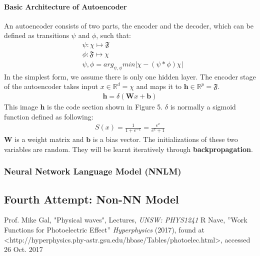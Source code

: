 \documentclass[paper=a4, fontsize=12pt]{scrartcl}
\begin{document}
\paragraph{Basic Architecture of Autoencoder}
An autoencoder consists of two parts, the encoder and the decoder, which can be defined as transitions $\psi$ and $\phi$, such that:
\begin{align*}
& \psi : \chi \mapsto \mathfrak{F} \\
& \phi : \mathfrak{F} \mapsto \chi \\
& \psi, \phi = arg_{\psi, \phi} min \lvert \chi - (\psi * \phi) \chi \rvert
\end{align*}
In the simplest form, we assume there is only one hidden layer. The encoder stage of the autoencoder takes input $x \in \mathbb{R}^{d} = \chi$ and maps it to $\mathbf{h} \in \mathbb{R}^{p} = \mathfrak{F}$. \\
\begin{align*}
\mathbf{h} = \delta (\mathbf{W}x + \mathbf{b})
\end{align*}
This image $\mathbf{h}$ is the code section shown in Figure 5. $\delta$ is normally a sigmoid function defined as following: \\
\begin{align*}
S(x) = \frac{1}{1 + e^{-x}} = \frac{e^x}{e^x + 1}
\end{align*}
$\mathbf{W}$ is a weight matrix and $\mathbf{b}$ is a bias vector. The initializations of these two variables are random. They will be learnt iteratively through \textbf{backpropagation}. \\


\subsubsection{Neural Network Language Model (NNLM)}

\subsection{Fourth Attempt: Non-NN Model}






\clearpage

\begin{thebibliography}{99}
 Prof. Mike Gal, "Physical waves", Lectures, {\em UNSW: PHYS1241}
 R Nave, ''Work Functions for Photoelectric Effect'' {\em Hyperphysics} (2017), found at <http://hyperphysics.phy-astr.gsu.edu/hbase/Tables/photoelec.html>, accessed 26 Oct. 2017

\end{thebibliography}
\end{document}
